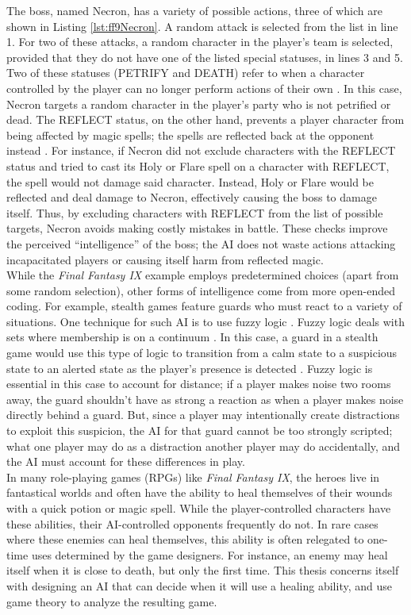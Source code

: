 The boss, named Necron, has a variety of possible actions, three of which are shown in Listing \ref{lst:ff9Necron}. A random attack is selected from the list in line 1. For two of these attacks, a random character in the player's team is selected, provided that they do not have one of the listed special statuses, in lines 3 and 5. Two of these statuses (PETRIFY and DEATH) refer to when a character controlled by the player can no longer perform actions of their own \cite{ffIX00}. In this case, Necron targets a random character in the player's party who is not petrified or dead. The REFLECT status, on the other hand, prevents a player character from being affected by magic spells; the spells are reflected back at the opponent instead \cite{ffIX00}. For instance, if Necron did not exclude characters with the REFLECT status and tried to cast its Holy or Flare spell on a character with REFLECT, the spell would not damage said character. Instead, Holy or Flare would be reflected and deal damage to Necron, effectively causing the boss to damage itself. Thus, by excluding characters with REFLECT from the list of possible targets, Necron avoids making costly mistakes in battle. These checks improve the perceived ``intelligence'' of the boss; the AI does not waste actions attacking incapacitated players or causing itself harm from reflected magic.\\

While the \textit{Final Fantasy IX} example employs predetermined choices (apart from some random selection), other forms of intelligence come from more open-ended coding. For example, stealth games feature guards who must react to a variety of situations. One technique for such AI is to use fuzzy logic \cite{schw04}. Fuzzy logic deals with sets where membership is on a continuum \cite{zade65}. In this case, a guard in a stealth game would use this type of logic to transition from a calm state to a suspicious state to an alerted state as the player's presence is detected \cite{schw04}. Fuzzy logic is essential in this case to account for distance; if a player makes noise two rooms away, the guard shouldn't have as strong a reaction as when a player makes noise directly behind a guard. But, since a player may intentionally create distractions to exploit this suspicion, the AI for that guard cannot be too strongly scripted; what one player may do as a distraction another player may do accidentally, and the AI must account for these differences in play.\\

In many role-playing games (RPGs) like \textit{Final Fantasy IX}, the heroes live in fantastical worlds and often have the ability to heal themselves of their wounds with a quick potion or magic spell. While the player-controlled characters have these abilities, their AI-controlled opponents frequently do not. In rare cases where these enemies can heal themselves, this ability is often relegated to one-time uses determined by the game designers. For instance, an enemy may heal itself when it is close to death, but only the first time. This thesis concerns itself with designing an AI that can decide when it will use a healing ability, and use game theory to analyze the resulting game.